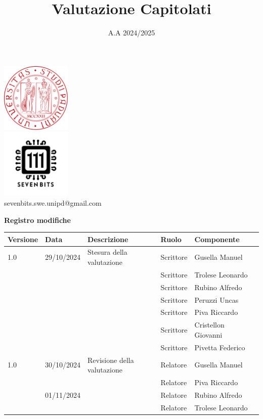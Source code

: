 \documentclass[10pt]{article}
\title{Valutazione Capitolati}
\date{A.A 2024/2025}
\begin{document}
\maketitle
\begin{center}
\includegraphics[width=0.25\textwidth]{LogoUnipd}\\
\includegraphics[width=0.25\textwidth]{Sevenbitslogo}\\
sevenbits.swe.unipd@gmail.com\\
\vspace{2mm}

\textbf{Registro modifiche}\\
\vspace{2mm}
\begin{tabular}{|l|l|l|l|l|l|}
\hline
\textbf{Versione} & \textbf{Data} & \textbf{Descrizione} & \textbf{Ruolo} & \textbf{Componente} \\
\hline
1.0 & 29/10/2024 & Stesura della valutazione & Scrittore & Gusella Manuel\\
& & & Scrittore & Trolese Leonardo\\
& & & Scrittore & Rubino Alfredo\\
& & & Scrittore & Peruzzi Uncas\\
& & & Scrittore & Piva Riccardo\\
& & & Scrittore & Cristellon Giovanni\\
& & & Scrittore & Pivetta Federico\\
\hline
1.0 & 30/10/2024 & Revisione della valutazione & Relatore & Gusella Manuel\\
& & & Relatore & Piva Riccardo\\
& 01/11/2024 & & Relatore & Rubino Alfredo\\
& & & Relatore & Trolese Leonardo\\
\hline
\end{tabular}
\end{center}
\newpage
\tableofcontents
\newpage
\end{document}
